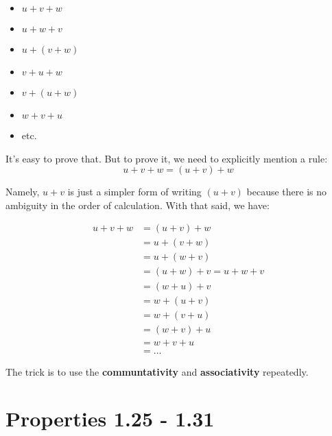 \documentclass[12pt, letterpaper, oneside]{book}
\begin{document}
\begin{itemize}
  \item $u + v + w$
  \item $u + w + v$
  \item $u + (v + w)$
  \item $v + u + w$
  \item $v + (u + w)$
  \item $w + v + u$
  \item etc.
\end{itemize}

It's easy to prove that. But to prove it, we need to explicitly mention a rule:
\[ u + v + w = (u + v) + w \]

Namely, $u + v$ is just a simpler form of writing $(u + v)$ because there is no
ambiguity in the order of calculation. With that said, we have:

\begin{equation*}
  \begin{split}
    u + v + w &= (u + v) + w \\
              &= u + (v + w) \\
              &= u + (w + v) \\
              &= (u + w) + v = u + w + v \\
              &= (w + u) + v \\
              &= w + (u + v) \\
              &= w + (v + u) \\
              &= (w + v) + u \\
              &= w + v + u \\
              &= \ldots 
  \end{split}
\end{equation*}

The trick is to use the \textbf{communtativity} and \textbf{associativity}
repeatedly.

\section{Properties 1.25 - 1.31}
\end{document}
